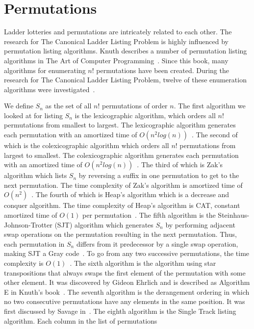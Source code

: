 \section{Permutations}
Ladder lotteries and permutations are intricately related to each other. 
The research for The Canonical Ladder Listing Problem is highly influenced 
by permutation listing algorithms. Knuth describes a number of 
permutation listing algorithms in The Art of Computer Programming~\cite{A18}. Since this book, many algorithms for 
enumerating $n!$ permutations have been created. During the research for The Canonical Ladder Listing Problem, twelve of these 
enumeration algorithms were investigated~\cite{A18,A19,A21,A24,A25,A26,A31,A34,A35,A36,A37}.\par 
We define \emph{$S_{n}$} as the set of all $n!$ permutations of order $n$. 
The first algorithm we looked at for listing $S_{n}$ is the lexicographic algorithm, which orders all $n!$ permutations from smallest to largest. The lexicographic 
algorithm generates each permutation with an amortized time of $O(n^{2}log(n))$~\cite{A21}. The second of which is the 
colexicographic algorithm which orders all $n!$ permutations from largest to smallest. The colexicographic 
algorithm generates each permutation with an amortized time of $O(n^{2}log(n))$~\cite{A19}. The third of which is Zak's 
algorithm which lists $S_{n}$ by reversing a suffix in one permutation to get to the next 
permutation. The time complexity of Zak's algorithm is amortized time of $O(n^{2})$~\cite{A31}.
The fourth of which is Heap's algorithm which is a decrease and conquer algorithm.  
The time complexity of Heap's algorithm is {\sc CAT}, constant amortized time of $O(1)$ per permutation~\cite{A24}.
The fifth algorithm is the Steinhaus-Johnson-Trotter (SJT) algorithm which generates $S_{n}$ by performing adjacent swap operations 
on the permutation resulting in the next permutation. Thus, each permutation in $S_{n}$ differs 
from it predecessor by a single swap operation, making SJT a Gray code~\cite{A25}. To go from any two successive permutations, 
the time complexity is $O(1)$~\cite{A25}.
The sixth algorithm is the algorithm using star transpositions that always swaps the first element of the permutation 
with some other element. It was discovered by Gideon Ehrlich and is described as Algorithm E in Knuth's book~\cite{A18}.
The seventh algorithm is the derangement ordering in which no two consecutive permutations have any elements 
in the same position. It was first discussed by Savage in~\cite{A35}. 
The eighth algorithm is the Single Track listing algorithm. Each column in the list of permutations 
